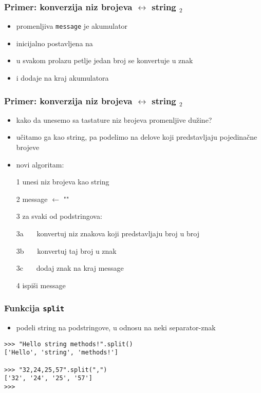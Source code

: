 \documentclass[utf8,compress]{beamer}
\begin{document}
\begin{frame}[fragile]
  \frametitle{Primer: konverzija niz brojeva $\leftrightarrow$ string $_2$}
  \begin{itemize}
    \item promenljiva \texttt{message} je akumulator
    \item inicijalno postavljena na 
    \item u svakom prolazu petlje jedan broj se konvertuje u znak
    \item i dodaje na kraj akumulatora
  \end{itemize}
\end{frame}

\begin{frame}[fragile]
  \frametitle{Primer: konverzija niz brojeva $\leftrightarrow$ string $_2$}
  \begin{itemize}
    \item kako da unesemo sa tastature niz brojeva promenljive dužine?
    \item učitamo ga kao string, pa podelimo na delove koji predstavljaju pojedinačne brojeve
    \item novi algoritam:
    \item[1] unesi niz brojeva kao string
    \item[2] message $\leftarrow$ ""
    \item[3] za svaki od podstringova:
    \item[3a] \ \ \ konvertuj niz znakova koji predstavljaju broj u broj
    \item[3b] \ \ \ konvertuj taj broj u znak
    \item[3c] \ \ \ dodaj znak na kraj message
    \item[4] ispiši message
  \end{itemize}
\end{frame}

\begin{frame}[fragile]
  \frametitle{Funkcija \texttt{split}}
  \begin{itemize}
    \item podeli string na podstringove, u odnosu na neki separator-znak
  \end{itemize}
\begin{verbatim}
>>> "Hello string methods!".split()
['Hello', 'string', 'methods!']

>>> "32,24,25,57".split(",")
['32', '24', '25', '57']
>>>
\end{verbatim}
\end{frame}
\end{document}
